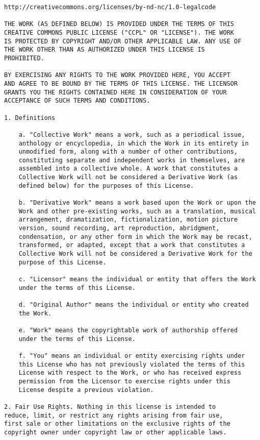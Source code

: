 \begin{verbatim}
http://creativecommons.org/licenses/by-nd-nc/1.0-legalcode

THE WORK (AS DEFINED BELOW) IS PROVIDED UNDER THE TERMS OF THIS
CREATIVE COMMONS PUBLIC LICENSE ("CCPL" OR "LICENSE"). THE WORK
IS PROTECTED BY COPYRIGHT AND/OR OTHER APPLICABLE LAW. ANY USE OF
THE WORK OTHER THAN AS AUTHORIZED UNDER THIS LICENSE IS
PROHIBITED.

BY EXERCISING ANY RIGHTS TO THE WORK PROVIDED HERE, YOU ACCEPT
AND AGREE TO BE BOUND BY THE TERMS OF THIS LICENSE. THE LICENSOR
GRANTS YOU THE RIGHTS CONTAINED HERE IN CONSIDERATION OF YOUR
ACCEPTANCE OF SUCH TERMS AND CONDITIONS.

1. Definitions

    a. "Collective Work" means a work, such as a periodical issue,
    anthology or encyclopedia, in which the Work in its entirety in
    unmodified form, along with a number of other contributions,
    constituting separate and independent works in themselves, are
    assembled into a collective whole. A work that constitutes a
    Collective Work will not be considered a Derivative Work (as
    defined below) for the purposes of this License.

    b. "Derivative Work" means a work based upon the Work or upon the
    Work and other pre-existing works, such as a translation, musical
    arrangement, dramatization, fictionalization, motion picture
    version, sound recording, art reproduction, abridgment,
    condensation, or any other form in which the Work may be recast,
    transformed, or adapted, except that a work that constitutes a
    Collective Work will not be considered a Derivative Work for the
    purpose of this License.

    c. "Licensor" means the individual or entity that offers the Work
    under the terms of this License.

    d. "Original Author" means the individual or entity who created
    the Work.

    e. "Work" means the copyrightable work of authorship offered
    under the terms of this License.

    f. "You" means an individual or entity exercising rights under
    this License who has not previously violated the terms of this
    License with respect to the Work, or who has received express
    permission from the Licensor to exercise rights under this
    License despite a previous violation.

2. Fair Use Rights. Nothing in this license is intended to
reduce, limit, or restrict any rights arising from fair use,
first sale or other limitations on the exclusive rights of the
copyright owner under copyright law or other applicable laws.


\end{verbatim}

